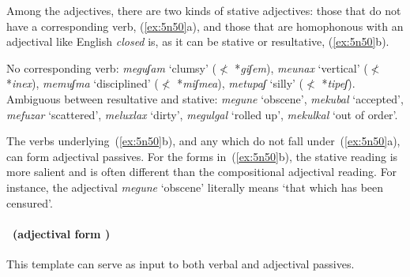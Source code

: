 \begin{exe}
\begin{xlist}
\begin{exe}
\begin{xlist}
\begin{exe}
\begin{exe}
\begin{xlist}
\begin{exe}
\begin{exe}
\begin{xlist}
\begin{exe}
\begin{xlist}
\begin{exe}
\begin{xlist}
\begin{exe}
\begin{xlist}
\begin{exe}
\begin{xlist}
\begin{xlist}
\begin{exe}
\begin{xlist}
\begin{exe}
\begin{xlist}
\begin{exe}
\begin{exe}
\begin{exe}
\begin{xlist}
\begin{exe}
\begin{exe}
\begin{xlist}
\begin{exe}
\begin{xlist}
\begin{exe}
\begin{xlist}
\begin{exe}
\begin{xlist}
\begin{xlist}
\begin{exe}
\begin{xlist}
\begin{exe}
\begin{xlist}
\begin{exe}
\begin{xlist}
\begin{exe}
\begin{xlist}
\begin{exe}
\begin{exe}
\begin{exe}
\begin{exe}
\begin{exe}
\begin{xlist}
\begin{xlist}
\begin{exe}
\begin{xlist}
\begin{exe}
\begin{xlist}
\begin{exe}
\begin{exe}
\begin{exe}
\begin{xlist}
Among the adjectives, there are two kinds of stative adjectives: those that do not have a corresponding verb, (\ref{ex:5n50}a), and those that are homophonous with an adjectival  like English \emph{closed} is, as it can be stative or resultative, (\ref{ex:5n50}b).
 \begin{exe}
 \ex  \label{ex:5n50}
 \begin{xlist} 
   \ex  No corresponding verb: \emph{meguʃam} `clumsy' ($\nless$ *\emph{giʃem}), \emph{meunax} `vertical' ($\nless$ *\emph{inex}), \emph{memuʃma} `disciplined' ($\nless$ *\emph{miʃmea}), \emph{metupaʃ} `silly' ($\nless$ *\emph{tipeʃ}). 
   \ex  Ambiguous between resultative and stative: \emph{megune} `obscene', \emph{mekubal} `accepted', \emph{mefuzar} `scattered', \emph{meluxlax} `dirty', \emph{megulgal} `rolled up', \emph{mekulkal} `out of order'.  
 \z
\z 


The verbs underlying~(\ref{ex:5n50}b), and any which do not fall under~(\ref{ex:5n50}a), can form adjectival passives. For the forms in~(\ref{ex:5n50}b), the stative reading is more salient and is often different than the compositional adjectival  reading. For instance, the adjectival  \emph{megune} `obscene' literally means `that which has been censured'.

\paragraph*{\thif~(adjectival form \mhuf)}
This template can serve as input to both verbal and adjectival passives.


\end{xlist}
\end{exe}
\end{xlist}
\end{exe}
\end{exe}
\end{exe}
\end{xlist}
\end{exe}
\end{xlist}
\end{exe}
\end{xlist}
\end{xlist}
\end{exe}
\end{exe}
\end{exe}
\end{exe}
\end{exe}
\end{xlist}
\end{exe}
\end{xlist}
\end{exe}
\end{xlist}
\end{exe}
\end{xlist}
\end{exe}
\end{xlist}
\end{xlist}
\end{exe}
\end{xlist}
\end{exe}
\end{xlist}
\end{exe}
\end{xlist}
\end{exe}
\end{exe}
\end{xlist}
\end{exe}
\end{exe}
\end{exe}
\end{xlist}
\end{exe}
\end{xlist}
\end{exe}
\end{xlist}
\end{xlist}
\end{exe}
\end{xlist}
\end{exe}
\end{xlist}
\end{exe}
\end{xlist}
\end{exe}
\end{xlist}
\end{exe}
\end{exe}
\end{xlist}
\end{exe}
\end{exe}
\end{xlist}
\end{exe}
\end{xlist}
\end{exe}
